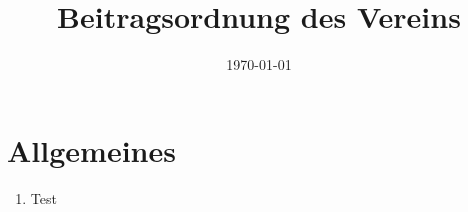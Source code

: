 \documentclass[12pt,a4paper,draft]{article}
\title{Beitragsordnung des Vereins \unsername}
\author{\unsername}
\date{\today}
\begin{document}
\maketitle
\tableofcontents

\section{Allgemeines}
\begin{enumerate}
\item Test
\end{enumerate}
\end{document}
